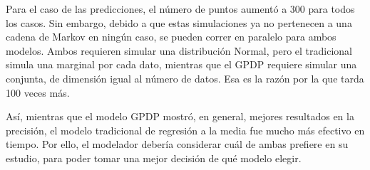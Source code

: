 Para el caso de las predicciones, el n\'umero de puntos aument\'o a 300 para todos los casos. Sin embargo, debido a que estas simulaciones ya no pertenecen a una cadena de Markov en ning\'un caso, se pueden correr en paralelo para ambos modelos. Ambos requieren simular una distribuci\'on Normal, pero el tradicional simula una marginal por cada dato, mientras que el GPDP requiere simular una conjunta, de dimensi\'on igual al n\'umero de datos. Esa es la raz\'on por la que tarda 100 veces m\'as.

As\'i, mientras que el modelo GPDP mostr\'o, en general, mejores resultados en la precisi\'on, el modelo tradicional de regresi\'on a la media fue mucho m\'as efectivo en tiempo. Por ello, el modelador deber\'ia considerar cu\'al de ambas prefiere en su estudio, para poder tomar una mejor decisi\'on de qu\'e modelo elegir.


\newpage